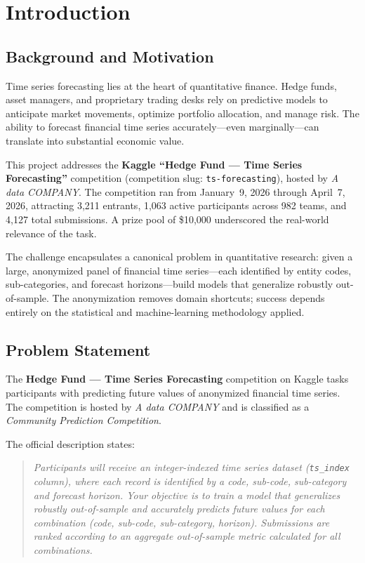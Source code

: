 \section{Introduction}
\label{sec:introduction}

\subsection{Background and Motivation}
Time series forecasting lies at the heart of quantitative finance. Hedge funds, asset managers, and proprietary trading desks rely on predictive models to anticipate market movements, optimize portfolio allocation, and manage risk. The ability to forecast financial time series accurately---even marginally---can translate into substantial economic value.

This project addresses the \textbf{Kaggle ``Hedge Fund --- Time Series Forecasting''} competition (competition slug: \texttt{ts-forecasting}), hosted by \emph{A data COMPANY}. The competition ran from January~9, 2026 through April~7, 2026, attracting 3,211 entrants, 1,063 active participants across 982 teams, and 4,127 total submissions. A prize pool of \$10,000 underscored the real-world relevance of the task.

The challenge encapsulates a canonical problem in quantitative research: given a large, anonymized panel of financial time series---each identified by entity codes, sub-categories, and forecast horizons---build models that generalize robustly out-of-sample. The anonymization removes domain shortcuts; success depends entirely on the statistical and machine-learning methodology applied.

\subsection{Problem Statement}
The \textbf{Hedge Fund --- Time Series Forecasting} competition on Kaggle tasks participants with predicting future values of anonymized financial time series. The competition is hosted by \emph{A data COMPANY} and is classified as a \emph{Community Prediction Competition}.

The official description states:
\begin{quote}
\itshape
Participants will receive an integer-indexed time series dataset (\texttt{ts\_index} column), where each record is identified by a code, sub-code, sub-category and forecast horizon. Your objective is to train a model that generalizes robustly out-of-sample and accurately predicts future values for each combination (code, sub-code, sub-category, horizon). Submissions are ranked according to an aggregate out-of-sample metric calculated for all combinations.
\end{quote}

